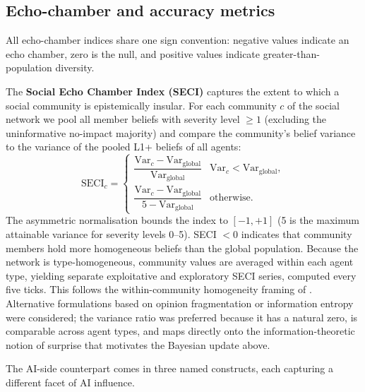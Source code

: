 \documentclass[pdflatex,sn-basic]{sn-jnl}
\begin{document}
\subsection{Echo-chamber and accuracy metrics}\label{sec:metrics}

All echo-chamber indices share one sign convention: negative values indicate an echo chamber, zero is the null, and positive values indicate greater-than-population diversity.

The \textbf{Social Echo Chamber Index (SECI)} captures the extent to which a social community is epistemically insular. For each community $c$ of the social network we pool all member beliefs with severity level $\geq 1$ (excluding the uninformative no-impact majority) and compare the community's belief variance to the variance of the pooled L1+ beliefs of all agents:
\begin{equation}
\text{SECI}_c =
\begin{cases}
\dfrac{\text{Var}_c - \text{Var}_{\text{global}}}{\text{Var}_{\text{global}}} & \text{Var}_c < \text{Var}_{\text{global}}, \\[2ex]
\dfrac{\text{Var}_c - \text{Var}_{\text{global}}}{5 - \text{Var}_{\text{global}}} & \text{otherwise}.
\end{cases}
\label{eq:seci}
\end{equation}
The asymmetric normalisation bounds the index to $[-1, +1]$ (5 is the maximum attainable variance for severity levels 0--5). SECI $< 0$ indicates that community members hold more homogeneous beliefs than the global population. Because the network is type-homogeneous, community values are averaged within each agent type, yielding separate exploitative and exploratory SECI series, computed every five ticks. This follows the within-community homogeneity framing of \citet{cinelli2021echo}.
Alternative formulations based on opinion fragmentation \citep{bail2018exposure} or information entropy \citep{sasahara2021social}
were considered; the variance ratio was preferred because it has a natural zero, is comparable across agent types, and maps directly onto the information-theoretic notion of surprise that motivates the Bayesian update above.

The AI-side counterpart comes in three named constructs, each capturing a different facet of AI influence.
\end{document}
